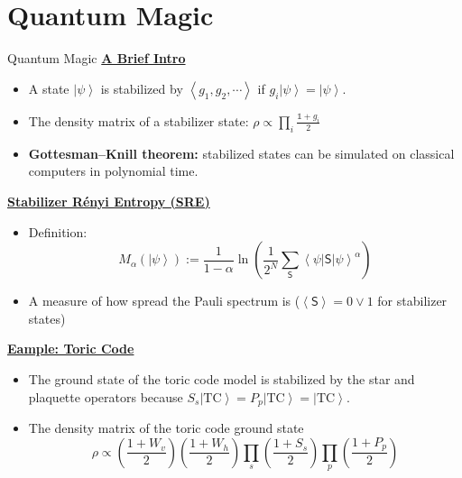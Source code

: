 \documentclass[professionalfont,
                xcolor=dvipsnames]{beamer}
\newcommand{\anglelr}[1]{\left\langle #1 \right\rangle}
\newcommand{\lr}[1]{\left(#1\right)}
\newcommand{\ket}[1]{\left| #1 \right\rangle}
\newcommand{\bra}[1]{\left\langle #1 \right|}
\newcommand{\mrm}[1]{\mathrm{#1}}
\begin{document}
\section{Quantum Magic}
\begin{frame}{Quantum Magic}
\textbf{\underline{A Brief Intro}}
    \begin{itemize}
        \item A state $\ket{\psi}$ is stabilized by $\anglelr{g_1, g_2,\cdots}$ if $g_i\ket{\psi} = \ket{\psi}$.
        \item The density matrix of a stabilizer state: $\rho \propto\prod_{i} \frac{\mathds{1} + g_i}{2}$
        \item \textbf{Gottesman–Knill theorem:} stabilized states can be simulated on classical computers in polynomial time.
    \end{itemize}

\pause

    \textbf{\underline{Stabilizer R\'enyi Entropy (SRE)}}
    \begin{itemize}
        \item Definition:
            \[
            M_\alpha(\ket{\psi})
            :=
            \frac{1}{1-\alpha}
            \ln\lr{
                \frac{1}{2^N}
                \sum_{\mathsf{S} }
                \bra{\psi} \mathsf{S} \ket{\psi}^\alpha
            }
            \]
        \item A measure of how spread the Pauli spectrum is ($\anglelr{\mathsf{S}} = 0\vee 1$ for stabilizer states)
    \end{itemize}

    \pause

\textbf{\underline{Eample: Toric Code}}
    \begin{itemize}
        \item The ground state of the toric code model is stabilized by the star and plaquette operators because $S_s\ket{\mrm{TC}} = P_p\ket{\mrm{TC}} = \ket{\mrm{TC}}$.
        \item The density matrix of the toric code ground state 
        \[
        \rho \propto \lr{\frac{1+W_v}{2}}\lr{\frac{1+W_h}{2}}\prod_{s}\lr{\frac{1+S_s}{2}}\prod_{p}\lr{\frac{1+P_p}{2}}
        \]
    \end{itemize}
\end{frame}
\end{document}
